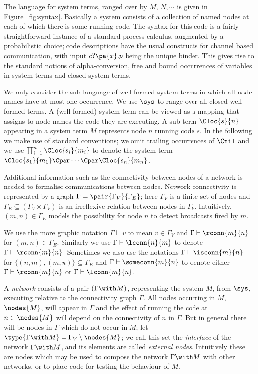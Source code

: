 \documentclass{LMCS}
\begin{document}
\noindent The language for system terms, ranged over by $M,\,N,\cdots$ is given in
Figure~\ref{fig:syntax}.  Basically a system consists of a collection
of named nodes at each of which there is some running code.  The
syntax for this code is a fairly straightforward instance of a standard
process calculus, augmented by a probabilistic choice; code
descriptions have the usual constructs for channel based communication,
with input $c?\pa{x}.p$ being the unique binder. 
This gives rise to the standard notions of alpha-conversion, 
free and bound occurrences of variables in system terms and 
closed system terms.

We only consider the 
sub-language of well-formed system terms in which all node names have
at most one occurrence.  We use $\sys$ to range over all closed
well-formed terms.  A (well-formed) system term can be viewed as a
mapping that assigns to node names the code they are executing. A
sub-term $\Cloc{s}{n}$ appearing in a system term $M$ represents node
$n$ running code $s$.
In the following we make use of standard conventions; we omit trailing 
occurrences of $\Cnil$ and we use $\prod_{i=1}^n \Cloc{s_i}{m_i}$ to 
denote the system term $\Cloc{s_1}{m_1} \Cpar \cdots \Cpar \Cloc{s_n}{m_n}$.

Additional information such as the
connectivity between nodes of a network is needed to formalise
communications between nodes. 
Network connectivity is represented by a graph $\Gamma = 
\pair{\Gamma_V}{\Gamma_E}$; here $\Gamma_V$ is a finite set of nodes
and $\Gamma_E \subseteq (\Gamma_V \times \Gamma_V)$ is an irreflexive relation 
between nodes in $\Gamma_V$. 
Intuitively, $(m,n) \in \Gamma_E$ models the possibility for node $n$ to detect 
broadcasts fired by $m$.
 
We use the more graphic notation $\Gamma \vdash v$ to mean $v \in \Gamma_V$ and 
$\Gamma \vdash \rconn{m}{n}$ for $(m,n) \in \Gamma_E$. 
Similarly we use $\Gamma \vdash \lconn{n}{m}$ to denote
$\Gamma \vdash \rconn{m}{n}$. 
Sometimes we also use the notations $\Gamma \vdash \isconn{m}{n}$ for 
$\{(n,m), (m,n)\} \subseteq \Gamma_E$ and 
$\Gamma \vdash \someconn{m}{n}$ to denote either $\Gamma \vdash \rconn{m}{n}$ 
or $\Gamma \vdash \lconn{m}{n}$.

A \emph{network} consists of a pair $(\Gamma \with M)$,
representing the system $M$, from $\sys$, executing relative to the connectivity graph
$\Gamma$.  All nodes occurring in $M$, $\nodes{M}$, will appear in
$\Gamma$ and the effect of  running  the code at $n \in \nodes{M}$
will depend on the connectivity of $n$ in $\Gamma$.  But in general
there will be nodes in $\Gamma$ which do not occur in $M$; let
$\type{\Gamma \with M} = \Gamma_V \setminus \nodes{M}$;  we call this set 
 the \emph{interface}
of the network $\Gamma \with M$, and its elements are called \emph{external nodes}.  Intuitively
these are nodes which may be used to compose the network $\Gamma
\with M$ with other networks, or to place code for testing the
behaviour of $M$.  
\end{document}
